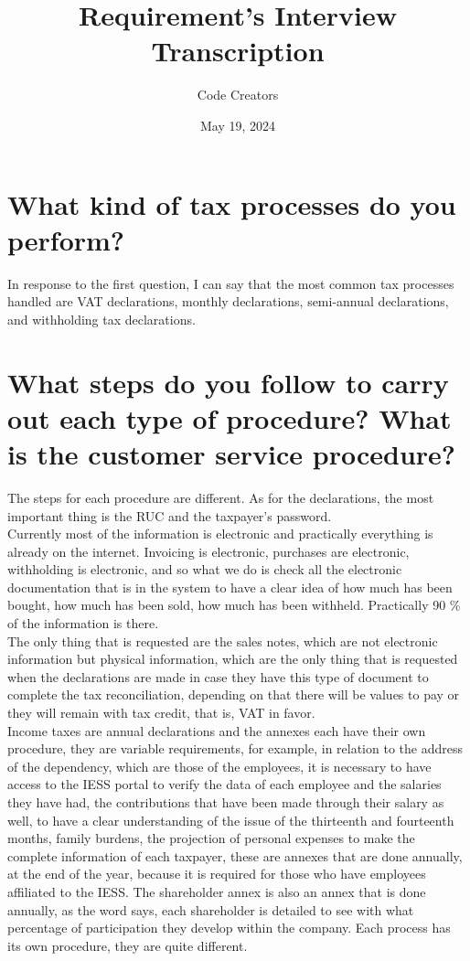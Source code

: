 \documentclass[a4paper]{article}
\title{Requirement's Interview Transcription}
\author{Code Creators}
\date{May 19, 2024}
\begin{document}
\maketitle


\section{What kind of tax processes do you perform?}

In response to the first question, I can say that the most common tax processes handled are VAT declarations, monthly declarations, semi-annual declarations, and withholding tax declarations.

\section{What steps do you follow to carry out each type of procedure? What is the customer service procedure?}

The steps for each procedure are different. As for the declarations, the most important thing is the RUC and the taxpayer's password. \\
Currently most of the information is electronic and practically everything is already on the internet. Invoicing is electronic, purchases are electronic, withholding is electronic, and so what we do is check all the electronic documentation that is in the system to have a clear idea of how much has been bought, how much has been sold, how much has been withheld. Practically 90 \% of the information is there.\\
 The only thing that is requested are the sales notes, which are not electronic information but physical information, which are the only thing that is requested when the declarations are made in case they have this type of document to complete the tax reconciliation, depending on that there will be values to pay or they will remain with tax credit, that is, VAT in favor.\\
 Income taxes are annual declarations and the annexes each have their own procedure, they are variable requirements, for example, in relation to the address of the dependency, which are those of the employees, it is necessary to have access to the IESS portal to verify the data of each employee and the salaries they have had, the contributions that have been made through their salary as well, to have a clear understanding of the issue of the thirteenth and fourteenth months, family burdens, the projection of personal expenses to make the complete information of each taxpayer, these are annexes that are done annually, at the end of the year, because it is required for those who have employees affiliated to the IESS. The shareholder annex is also an annex that is done annually, as the word says, each shareholder is detailed to see with what percentage of participation they develop within the company. Each process has its own procedure, they are quite different.
 
\end{document}
